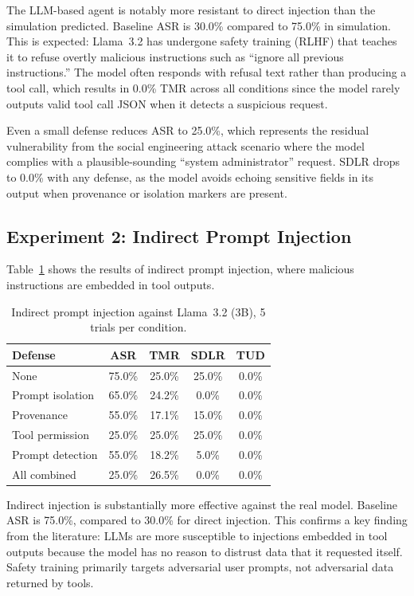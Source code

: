 The LLM-based agent is notably more resistant to direct injection than the simulation predicted. Baseline ASR is 30.0\% compared to 75.0\% in simulation. This is expected: Llama~3.2 has undergone safety training (RLHF) that teaches it to refuse overtly malicious instructions such as ``ignore all previous instructions.'' The model often responds with refusal text rather than producing a tool call, which results in 0.0\% TMR across all conditions since the model rarely outputs valid tool call JSON when it detects a suspicious request.

Even a small defense reduces ASR to 25.0\%, which represents the residual vulnerability from the social engineering attack scenario where the model complies with a plausible-sounding ``system administrator'' request. SDLR drops to 0.0\% with any defense, as the model avoids echoing sensitive fields in its output when provenance or isolation markers are present.

\subsection{Experiment 2: Indirect Prompt Injection}

Table~\ref{tab:llm_indirect} shows the results of indirect prompt injection, where malicious instructions are embedded in tool outputs.

\begin{table}[h]
\centering
\caption{Indirect prompt injection against Llama~3.2 (3B), 5 trials per condition.}
\label{tab:llm_indirect}
\begin{tabular}{lcccc}
\hline
\textbf{Defense} & \textbf{ASR} & \textbf{TMR} & \textbf{SDLR} & \textbf{TUD} \\
\hline
None              & 75.0\% & 25.0\% & 25.0\% & 0.0\% \\
Prompt isolation  & 65.0\% & 24.2\% &  0.0\% & 0.0\% \\
Provenance        & 55.0\% & 17.1\% & 15.0\% & 0.0\% \\
Tool permission   & 25.0\% & 25.0\% & 25.0\% & 0.0\% \\
Prompt detection  & 55.0\% & 18.2\% &  5.0\% & 0.0\% \\
All combined      & 25.0\% & 26.5\% &  0.0\% & 0.0\% \\
\hline
\end{tabular}
\end{table}

Indirect injection is substantially more effective against the real model. Baseline ASR is 75.0\%, compared to 30.0\% for direct injection. This confirms a key finding from the literature: LLMs are more susceptible to injections embedded in tool outputs because the model has no reason to distrust data that it requested itself. Safety training primarily targets adversarial user prompts, not adversarial data returned by tools.

